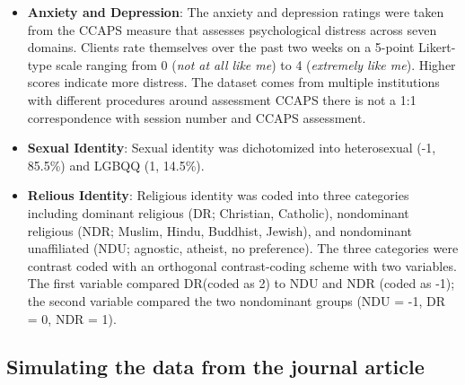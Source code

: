 \documentclass[
  11pt,
]{book}
\begin{document}
\begin{itemize}
\item
  \textbf{Anxiety and Depression}: The anxiety and depression ratings were taken from the CCAPS measure \citep{locke_development_2012} that assesses psychological distress across seven domains. Clients rate themselves over the past two weeks on a 5-point Likert-type scale ranging from 0 (\emph{not at all like me}) to 4 (\emph{extremely like me}). Higher scores indicate more distress. The dataset comes from multiple institutions with different procedures around assessment CCAPS there is not a 1:1 correspondence with session number and CCAPS assessment.
\item
  \textbf{Sexual Identity}: Sexual identity was dichotomized into heterosexual (-1, 85.5\%) and LGBQQ (1, 14.5\%).
\item
  \textbf{Relious Identity}: Religious identity was coded into three categories including dominant religious (DR; Christian, Catholic), nondominant religious (NDR; Muslim, Hindu, Buddhist, Jewish), and nondominant unaffiliated (NDU; agnostic, atheist, no preference). The three categories were contrast coded with an orthogonal contrast-coding scheme with two variables. The first variable compared DR(coded as 2) to NDU and NDR (coded as -1); the second variable compared the two nondominant groups (NDU = -1, DR = 0, NDR = 1).
\end{itemize}

\hypertarget{simulating-the-data-from-the-journal-article-1}{%
\subsection{Simulating the data from the journal article}\label{simulating-the-data-from-the-journal-article-1}}
\end{document}
